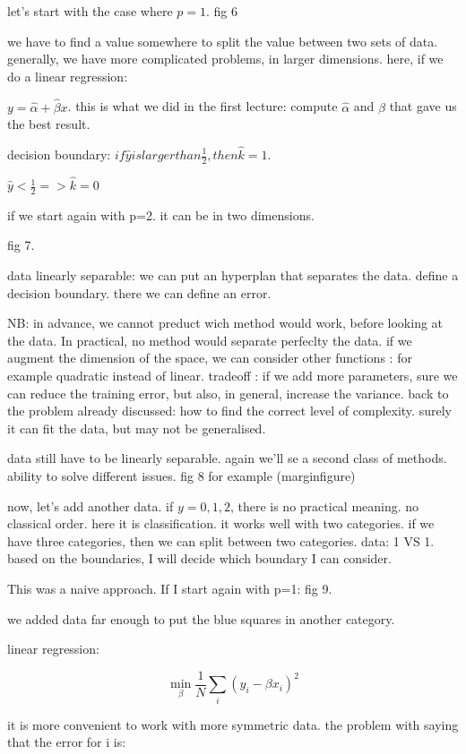 \documentclass[a4paper]{tufte-book}
\newcommand{\half}{\frac{1}{2}}
\begin{document}
let's start with the case where $p=1$.
fig 6

we have to find a value somewhere to split the value between two sets of data.
generally, we have more complicated problems, in larger dimensions.
here, if we do a linear regression:

$y = \hat \alpha + \hat \beta x$.
this is what we did in the first lecture: compute $\hat \alpha$ and $\hat \beta$ that gave us
the best result.

decision boundary:
$if \hat y is larger than \half, then \hat k = 1$.

$\hat y < \half => \hat k = 0$

if we start again with p=2.
it can be in two dimensions.

fig 7.

data linearly separable: we can put an hyperplan that separates the data.
define a decision boundary.
there we can define an error.

NB: in advance, we cannot preduct wich method would work, before looking at the
data. In practical, no method would separate perfeclty the data.
if we augment the dimension of the space, we can consider other functions : for
example quadratic instead of linear.
tradeoff : if we add more parameters, sure we can reduce the training error, but
also, in general, increase the variance.
back to the problem already discussed: how to find the correct level of
complexity. surely it can fit the data, but may not be generalised.

data still have to be linearly separable.
again we'll se a second class of methods. ability to solve different issues.
fig 8 for example (marginfigure)

now, let's add another data.
if $y= 0,1,2$, there is no practical meaning. no classical order. here it is
classification.
it works well with two categories. if we have three categories, then we can
split between two categories. data: 1 VS 1.
based on the boundaries, I will decide which boundary I can consider.


This was a naive approach. If I start again with p=1:
fig 9.

we added data far enough to put the blue squares in another category.

linear regression:

\begin{equation}
    \min_\beta \frac{1}{N} \sum_i (y_i - \beta x_i)^2
\end{equation}

it is more convenient to work with more symmetric data.
the problem with saying that the error for i is:
\end{document}
